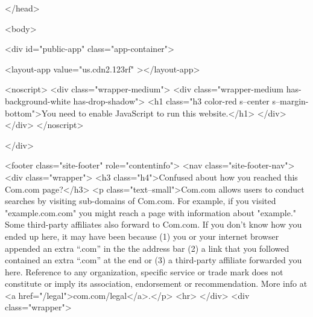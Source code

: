 </head>

<body>

<div id="public-app" class="app-container">

        
        <layout-app
        value="us.cdn2.123rf"
    ></layout-app>


        <noscript>
            <div class="wrapper-medium">
                <div class="wrapper-medium has-background-white has-drop-shadow">
                    <h1 class="h3 color-red s--center s--margin-bottom">You need to enable JavaScript to run this website.</h1>
                </div>
            </div>
        </noscript>

    </div>

    
        <footer class="site-footer" role="contentinfo">
    <nav class="site-footer-nav">
                    <div class="wrapper">
                <h3 class="h4">Confused about how you reached this Com.com page?</h3>
                <p class="text--small">Com.com allows users to conduct searches by visiting sub-domains of Com.com. For example, if you visited "example.com.com" you might reach a page with information about "example." Some third-party affiliates also forward to Com.com. If you don't know how you ended up here, it may have been because (1) you or your internet browser appended an extra “.com” in the the address bar (2) a link that you followed contained an extra “.com” at the end or (3) a third-party affiliate forwarded you here. Reference to any organization, specific service or trade mark does not constitute or imply its association, endorsement or recommendation. More info at <a href="/legal">com.com/legal</a>.</p>
                <hr>
            </div>
                <div class="wrapper">


